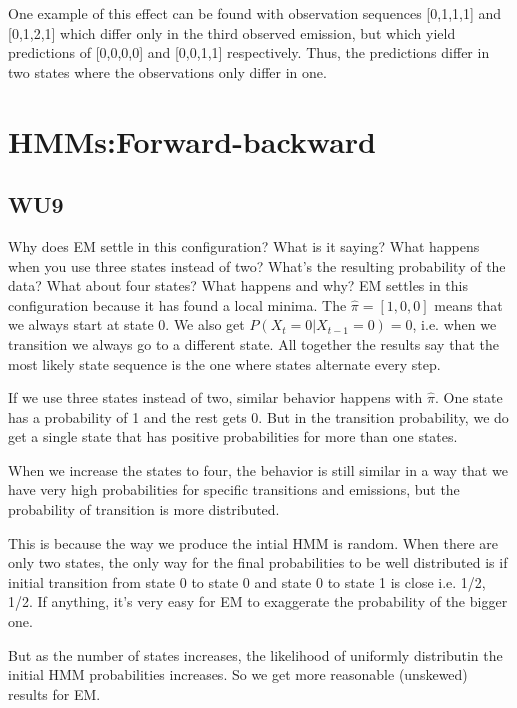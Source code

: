 \documentclass[a4paper,11pt]{article}
\begin{document}

One example of this effect can be found with observation sequences
[0,1,1,1] and [0,1,2,1] which differ only in the third observed emission,
but which yield predictions of [0,0,0,0] and [0,0,1,1] respectively.
Thus, the predictions differ in two states where the observations only
differ in one.

\section{HMMs:Forward-backward}
\subsection{WU9}
\textsf{Why does EM settle in this configuration? What is it saying? 
What happens when you use three states instead of two? 
What's the resulting probability of the data? 
What about four states? What happens and why?}\vspace{0.1in}
EM settles in this configuration because it has found a local minima. The
$\hat \pi = [1,0,0]$ means that we always start at state 0. We also get $P(X_t=0|X_{t-1}=0)= 0$,
i.e. when we transition we always go to a different state. All
together the results say that the most likely state sequence is the
one where states alternate every step.

If we use three states instead of two, similar behavior happens with
$\hat \pi$. One state has a probability of 1 and the rest gets 0. But
in the transition probability, we do get a single state that
has positive probabilities for more than one states.

When we increase the states to four, the behavior is still similar in
a way that we have very high probabilities for specific transitions
and emissions, but the probability of transition is more distributed.

This is because the way we produce the intial HMM is random. When
there are only two states, the only way for the final probabilities to
be well distributed is if initial transition from state 0 to state 0
and state 0 to state 1 is close i.e. 1/2, 1/2. If anything, it's very
easy for EM to exaggerate the probability of the bigger one.

But as the number of states increases, the likelihood of uniformly
distributin the initial HMM probabilities increases. So we get more
reasonable (unskewed) results for EM.
\end{document}
